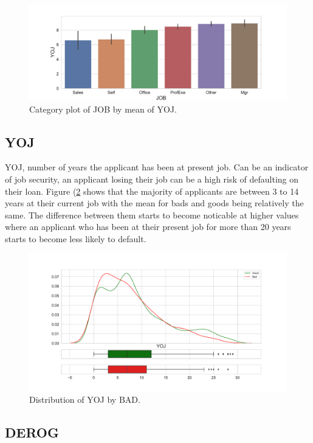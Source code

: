 \begin{figure}[H]
	\centering
	\includegraphics[scale=0.40]{figs/job_yoj_cat.pdf}
	\caption{Category plot of JOB by mean of YOJ. \label{job_yoj_cat}}
\end{figure}

\subsection*{YOJ}

YOJ, number of years the applicant has been at present job. Can be an indicator of job security,  an applicant losing their job can be a high risk of defaulting on their loan. Figure (\ref{yoj_dist} shows that the majority of applicants are between 3 to 14 years at their current job with the mean for bads and goods being relatively the same. The difference between them starts to become noticable at higher values where an applicant who has been at their present job for more than 20 years starts to become less likely to default.

\begin{figure}[H]
	\centering
	\includegraphics[scale=0.40]{figs/yoj_dist.pdf}
	\caption{Distribution of YOJ by BAD. \label{yoj_dist}}
\end{figure}

\subsection*{DEROG}

